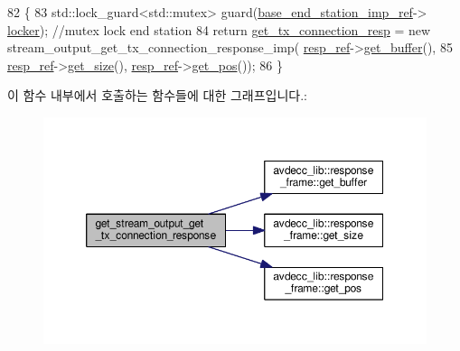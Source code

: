 \begin{DoxyCode}
82 \{
83     std::lock\_guard<std::mutex> guard(\hyperlink{classavdecc__lib_1_1descriptor__base__imp_a550c969411f5f3b69f55cc139763d224}{base\_end\_station\_imp\_ref}->
      \hyperlink{classavdecc__lib_1_1end__station__imp_a2207f93fef130266b292686bf96ef8d3}{locker}); \textcolor{comment}{//mutex lock end station}
84     \textcolor{keywordflow}{return} \hyperlink{classavdecc__lib_1_1stream__output__descriptor__imp_a473ecad2862f8c07039b0986ebec35e1}{get\_tx\_connection\_resp} = \textcolor{keyword}{new} stream\_output\_get\_tx\_connection\_response\_imp(
      \hyperlink{classavdecc__lib_1_1descriptor__base__imp_a2642e3a7c10d38553e7ff4a55e875346}{resp\_ref}->\hyperlink{classavdecc__lib_1_1response__frame_ad4680d622c198b5256c03b2eb2638c22}{get\_buffer}(),
85                                                                                      
      \hyperlink{classavdecc__lib_1_1descriptor__base__imp_a2642e3a7c10d38553e7ff4a55e875346}{resp\_ref}->\hyperlink{classavdecc__lib_1_1response__frame_adf55ed6a1edf8e1aa4f3f5f97936ad1e}{get\_size}(), \hyperlink{classavdecc__lib_1_1descriptor__base__imp_a2642e3a7c10d38553e7ff4a55e875346}{resp\_ref}->\hyperlink{classavdecc__lib_1_1response__frame_a4038092b7b420000faefc768241adb42}{get\_pos}());
86 \}
\end{DoxyCode}


이 함수 내부에서 호출하는 함수들에 대한 그래프입니다.\+:
\nopagebreak
\begin{figure}[H]
\begin{center}
\leavevmode
\includegraphics[width=350pt]{classavdecc__lib_1_1stream__output__descriptor__imp_a7cafc3a5460f315c7d912702899d8588_cgraph}
\end{center}
\end{figure}


